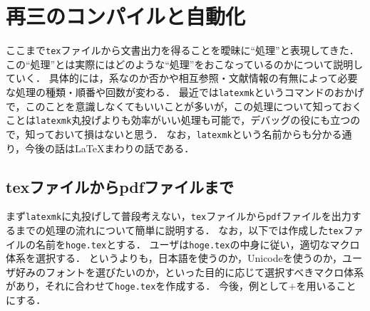 \documentclass[./main]{subfiles}
\begin{document}
\section{再三のコンパイルと自動化}
\noindent
ここまで\verb|tex|ファイルから文書出力を得ることを曖昧に``処理''と表現してきた．
この``処理''とは実際にはどのような``処理''をおこなっているのかについて説明していく．
具体的には，\pdfTeX 系なのか否かや相互参照・文献情報の有無によって必要な処理の種類・順番や回数が変わる．
最近では\verb|latexmk|というコマンドのおかげで，このことを意識しなくてもいいことが多いが，この処理について知っておくことは\verb|latexmk|丸投げよりも効率がいい処理も可能で，デバッグの役にも立つので，知っておいて損はないと思う．
なお，\verb|latexmk|という名前からも分かる通り，今後の話は\LaTeX まわりの話である．

\subsection{texファイルからpdfファイルまで}
\noindent
まず\verb|latexmk|に丸投げして普段考えない，\verb|tex|ファイルから\verb|pdf|ファイルを出力するまでの処理の流れについて簡単に説明する\supercite{LaTeXcompile_Yamamoto}．
なお，以下では作成した\verb|tex|ファイルの名前を\verb|hoge.tex|とする．
ユーザは\verb|hoge.tex|の中身に従い，適切なマクロ体系を選択する．
というよりも，日本語を使うのか，Unicodeを使うのか，ユーザ好みのフォントを選びたいのか，といった目的に応じて選択すべきマクロ体系があり，それに合わせて\verb|hoge.tex|を作成する．
今後，例として\LuaLaTeX $+$\upBibTeX を用いることにする．
\end{document}
